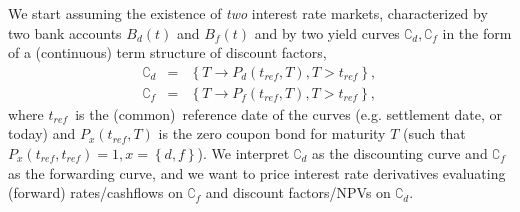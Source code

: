 \documentclass[11pt,reqno]{amsart}
\begin{document}
We start assuming the existence of \textit{two} interest rate markets,
characterized by two bank accounts $B_{d}\left( t\right) $ and $B_{f}\left(
t\right) $ and by two yield curves $\complement _{d},\complement _{f}$ in
the form of a (continuous) term structure of discount factors,%
\begin{eqnarray}
\complement _{d} &=&\left\{ T\longrightarrow P_{d}\left( t_{ref},T\right)
,T>t_{ref}\right\} , \\
\complement _{f} &=&\left\{ T\longrightarrow P_{f}\left( t_{ref},T\right)
,T>t_{ref}\right\} ,
\end{eqnarray}%
where $t_{ref}$\ is the (common)\ reference date of the curves (e.g.
settlement date, or today) and $P_{x}\left( t_{ref},T\right) $ is the zero
coupon bond for maturity $T$ (such that $P_{x}\left( t_{ref},t_{ref}\right)
=1,x=\left\{ d,f\right\} $). We interpret $\complement _{d}$ as the
discounting curve and $\complement _{f}$ as the forwarding curve, and we
want to price interest rate derivatives evaluating (forward) rates/cashflows
on $\complement _{f}$ and discount factors/NPVs on $\complement _{d}$.
\end{document}
